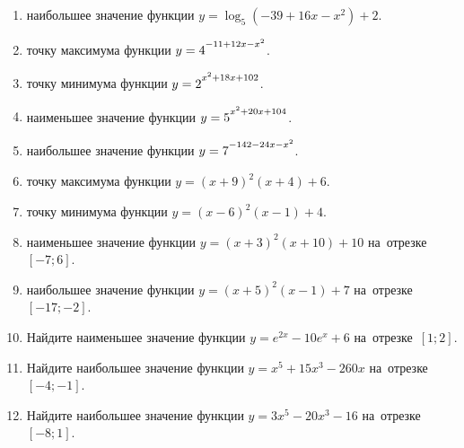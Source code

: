 \documentclass[a4paper,10pt]{article}
\begin{document}
\begin{enumerate}
\item {} наибольшее значение функции $y=\log_5\left(-39+16x-x^2\right)+2$.

\item {} точку максимума функции $y=4\strut^{-11+12x-x^2}$.

\item {} точку минимума функции $y=2\strut^{x^2+18x+102}$.

\item {} наименьшее значение функции $y=5\strut^{x^2+20x+104}$.

\item {} наибольшее значение функции $y=7\strut^{-142-24x-x^2}$.

\item {} точку максимума функции $y=\left(x+9\right)^2\left(x+4\right)+6$.

\item {} точку минимума функции $y=\left(x-6\right)^2\left(x-1\right)+4$.

\item {} наименьшее значение функции $y=\left(x+3\right)^2\left(x+10\right)+10$ на~отрезке~$\left[-7;6\right]$.

\item {} наибольшее значение функции $y=\left(x+5\right)^2\left(x-1\right)+7$ на~отрезке~$\left[-17;-2\right]$.

\item Найдите наименьшее значение функции $y=e^{2x}-10e^x+6$ на~отрезке~$\left[1;2\right]$.

\item Найдите наибольшее значение функции $y=x^5+15x^3-260x$ на~отрезке~$\left[-4;-1\right]$.

\item Найдите наибольшее значение функции $y=3x^5-20x^3-16$ на~отрезке~$\left[-8;1\right]$.

\end{enumerate}
\end{document}
